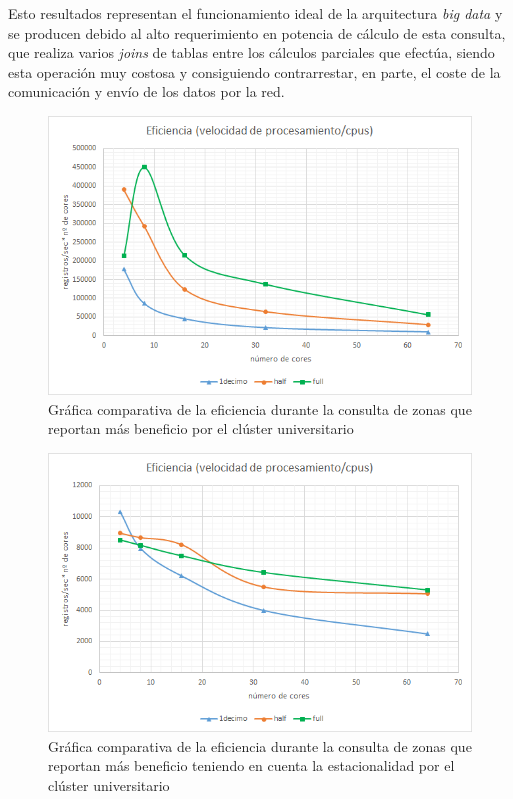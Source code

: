 Esto resultados representan el funcionamiento ideal de la arquitectura \textit{big data} y se producen debido al alto requerimiento en potencia de cálculo de esta consulta, que realiza varios \textit{joins} de tablas entre los cálculos parciales que efectúa, siendo esta operación muy costosa y consiguiendo contrarrestar, en parte, el coste de la comunicación y envío de los datos por la red.

\begin{figure}[htp!]
	\centering
	\caption{Gráfica comparativa de la eficiencia durante la consulta de zonas que reportan más beneficio por el clúster universitario}
	\label{gra:efiProUni}
	\vspace{5pt}
	\includegraphics[scale=0.85]{graficas/ebuni2}
\end{figure}
\begin{figure}[htp!]
	\centering
	\caption{Gráfica comparativa de la eficiencia durante la consulta de zonas que reportan más beneficio teniendo en cuenta la estacionalidad por el clúster universitario}
	\label{gra:efiProDayUni}
	\vspace{5pt}
	\includegraphics[scale=0.9]{graficas/ebduni2}
\end{figure}

